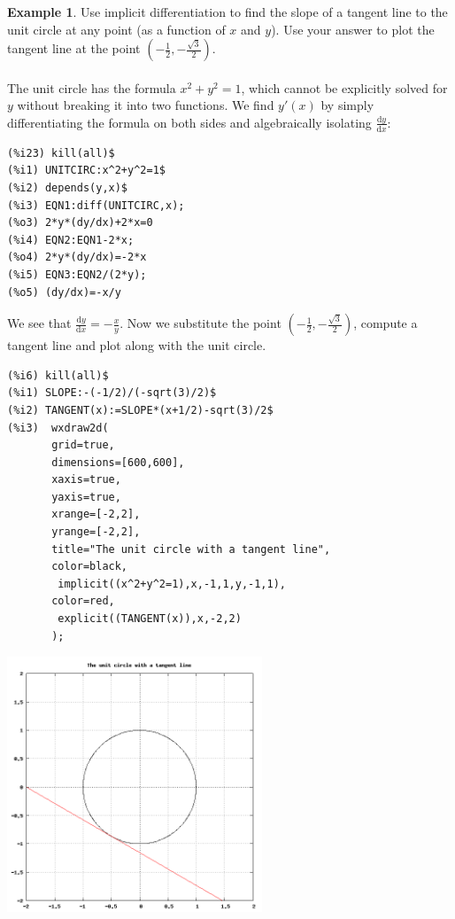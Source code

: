 \documentclass[10.5pt,twoside]{report}
\theoremstyle{definition}
\newtheorem{exmp}{Example}[section]
\begin{document}
\begin{exmp}  Use implicit differentiation to find the slope of a tangent line to the unit circle at any point (as a function of $x$ and $y$).  Use your answer to plot the tangent line at the point $(-\frac{1}{2},-\frac{\sqrt{3}}{2})$.\\
${}$\\

The unit circle has the formula $x^2+y^2=1$, which cannot be explicitly solved for $y$ without breaking it into two functions.  We find $y'(x)$ by simply differentiating the formula on both sides and algebraically isolating $\frac{\mathrm{d}y}{\mathrm{d}x}$:



\begin{verbatim}
(%i23) kill(all)$
(%i1) UNITCIRC:x^2+y^2=1$
(%i2) depends(y,x)$
(%i3) EQN1:diff(UNITCIRC,x);
(%o3) 2*y*(dy/dx)+2*x=0
(%i4) EQN2:EQN1-2*x;
(%o4) 2*y*(dy/dx)=-2*x
(%i5) EQN3:EQN2/(2*y);
(%o5) (dy/dx)=-x/y
\end{verbatim}

We see that $\frac{\mathrm{d}y}{\mathrm{d}x}=-\frac{x}{y}$.  Now we substitute the point $(-\frac{1}{2},-\frac{\sqrt{3}}{2})$, compute a tangent line and plot along with the unit circle.

\begin{verbatim}
(%i6) kill(all)$
(%i1) SLOPE:-(-1/2)/(-sqrt(3)/2)$
(%i2) TANGENT(x):=SLOPE*(x+1/2)-sqrt(3)/2$
(%i3)  wxdraw2d(
       grid=true,
       dimensions=[600,600],
       xaxis=true,
       yaxis=true,
       xrange=[-2,2],
       yrange=[-2,2],
       title="The unit circle with a tangent line",
       color=black,
        implicit((x^2+y^2=1),x,-1,1,y,-1,1),
       color=red,
        explicit((TANGENT(x)),x,-2,2)
       );
\end{verbatim}

\includegraphics[width=3in]{example_4_3_4}



\end{exmp}
\end{document}
